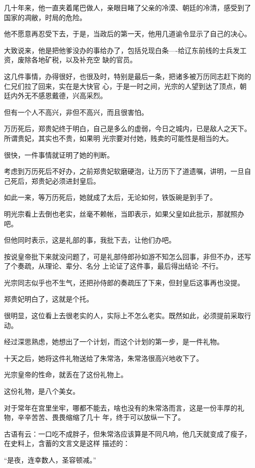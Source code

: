 \documentclass[11pt,a4paper,onecolumn]{article}
\begin{document}
几十年来，他一直夹着尾巴做人，亲眼目睹了父亲的冷漠、朝廷的冷清，感受到了国家的凋敝，时局的危险。

他不愿意再忍受下去，于是，当政后的第一天，他用几道谕令显示了自己的决心。

大致说来，他是把他爹没办的事给办了，包括兑现白条----给辽东前线的士兵发工资，废除各地矿税，以及补充空
缺的官员。

这几件事情，办得很好，也很及时，特别是最后一条，把诸多被万历同志赶下岗的仁兄们拉了回来，实在是大快官
心，于是一时之间，光宗的人望到达了顶点，朝廷内外无不感恩戴德，兴高采烈。

但有一个人不高兴，非但不高兴，而且很害怕。

万历死后，郑贵妃终于明白，自己是多么的虚弱，今日之城内，已是敌人之天下。所谓贵妃，其实也不贵，如果明
光宗要对付她，贱卖的可能性是相当的大。

很快，一件事情就证明了她的判断。

考虑到万历死后不好办，之前郑贵妃软磨硬泡，让万历下了道遗嘱，讲明，一旦自己死后，郑贵妃必须进封皇后。

如此一来，等万历死后，她就成了太后，无论如何，铁饭碗是到手了。

明光宗看上去倒也老实，丝毫不赖帐，当即表示，如果父皇如此批示，那就照办吧。

但他同时表示，这是礼部的事，我批下去，让他们办吧。

按说皇帝批下来就没问题了，可是礼部侍郎孙如游不知怎么回事，非但不办，还写了个奏疏，从理论、辈分、名分
上论证了这件事，最后得出结论--不行。

光宗同志似乎也不生气，还把孙侍郎的奏疏压了下来，但封皇后这事再也没提。

郑贵妃明白了，这就是个托。

很明显，这位看上去很老实的人，实际上不怎么老实。既然如此，必须提前采取行动。

经过深思熟虑，她想出了一个计划，而这个计划的第一步，是一件礼物。

十天之后，她将这件礼物送给了朱常洛，朱常洛很高兴地收下了。

光宗皇帝的性命，就丢在了这份礼物上。

这份礼物，是八个美女。

对于常年在宫里坐牢，哪都不能去，啥也没有的朱常洛而言，这是一份丰厚的礼物，辛辛苦苦、畏畏缩缩了几十
年，终于可以放纵一下了。

古语有云：一口吃不成胖子，但朱常洛应该算是不同凡响，他几天就变成了瘦子，在史料上，含蓄的文言文是这样
描述的：

``是夜，连幸数人，圣容顿减。''
\end{document}
